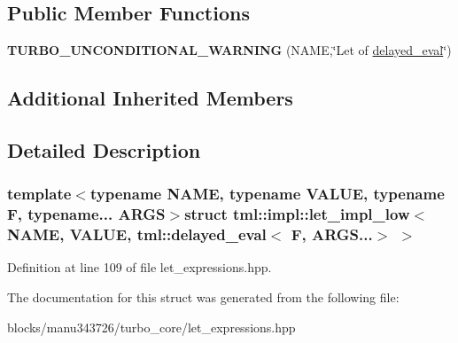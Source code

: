 \subsection*{Public Member Functions}
\begin{DoxyCompactItemize}
\item 
\hypertarget{structtml_1_1impl_1_1let__impl__low_3_01_n_a_m_e_00_01_v_a_l_u_e_00_01tml_1_1delayed__eval_3_01_f_00_01_a_r_g_s_8_8_8_4_01_4_a36172a73722b1f8617702f36977a4d4c}{{\bfseries T\+U\+R\+B\+O\+\_\+\+U\+N\+C\+O\+N\+D\+I\+T\+I\+O\+N\+A\+L\+\_\+\+W\+A\+R\+N\+I\+N\+G} (N\+A\+M\+E,\char`\"{}Let of \hyperlink{structtml_1_1delayed__eval}{delayed\+\_\+eval}\char`\"{})}\label{structtml_1_1impl_1_1let__impl__low_3_01_n_a_m_e_00_01_v_a_l_u_e_00_01tml_1_1delayed__eval_3_01_f_00_01_a_r_g_s_8_8_8_4_01_4_a36172a73722b1f8617702f36977a4d4c}

\end{DoxyCompactItemize}
\subsection*{Additional Inherited Members}


\subsection{Detailed Description}
\subsubsection*{template$<$typename N\+A\+M\+E, typename V\+A\+L\+U\+E, typename F, typename... A\+R\+G\+S$>$struct tml\+::impl\+::let\+\_\+impl\+\_\+low$<$ N\+A\+M\+E, V\+A\+L\+U\+E, tml\+::delayed\+\_\+eval$<$ F, A\+R\+G\+S...$>$ $>$}



Definition at line 109 of file let\+\_\+expressions.\+hpp.



The documentation for this struct was generated from the following file\+:\begin{DoxyCompactItemize}
\item 
blocks/manu343726/turbo\+\_\+core/let\+\_\+expressions.\+hpp\end{DoxyCompactItemize}
